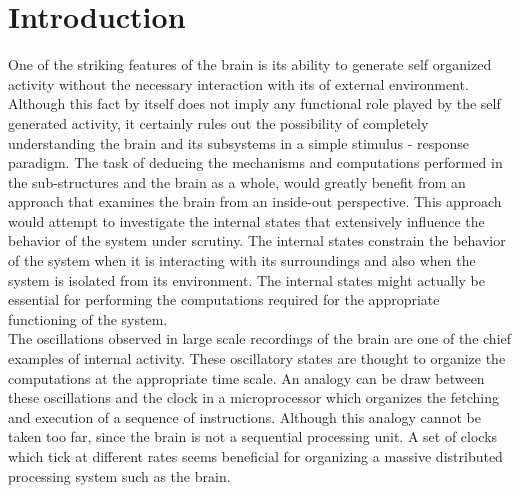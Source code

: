 \chapter{Introduction} 

\label{intro}

One  of the striking features of the brain is its ability to generate self organized activity without the necessary interaction with its of external environment. Although this fact by itself does not imply any functional role played by the self generated activity, it certainly rules out the possibility of completely understanding the brain and its subsystems in a simple stimulus - response paradigm. The task of deducing the mechanisms and computations performed in the sub-structures and  the brain as a whole, would greatly benefit from an approach that examines the brain from an inside-out perspective. This approach would attempt to investigate the internal states that extensively influence the behavior of the system under scrutiny. The internal states constrain the behavior of the system when it is interacting with its surroundings and also when the system is isolated from its environment. The internal states might actually be essential for performing the computations required for the appropriate functioning of the system. \\

The oscillations observed in large scale recordings of the brain are one of the chief examples of internal  activity. These oscillatory states are thought to organize the computations at the appropriate time scale. An analogy can be draw between these oscillations and the clock in a microprocessor which organizes the fetching and execution of a sequence of instructions. Although this analogy cannot be taken too far, since the brain is not a sequential processing unit. A set of clocks which tick at different rates seems beneficial for organizing a massive distributed processing system such as the brain. \\

